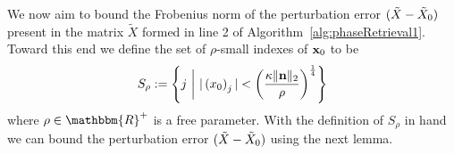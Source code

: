 We now aim to bound the Frobenius norm of the perturbation error $(\tilde{X} - \tilde{X}_0)$ present in the matrix $\tilde{X}$ formed in line 2 of Algorithm~\ref{alg:phaseRetrieval1}.
Toward this end we define the set of $\rho$-small indexes of $\mathbf x_0$ to be 
\begin{equation}
S_\rho := \left\{ j~\bigg|~ | \left( x_0 \right)_j | < \left(\frac{\kappa \| \mathbf n \|_2}{\rho} \right)^{\frac{1}{4}} \right\}
\label{equ:SrhoDef}
\end{equation}
where $\rho \in \mathbbm{R}^+$ is a free parameter.  
%
%
With the definition of $S_\rho$ in hand we can bound the perturbation error $(\tilde{X} - \tilde{X}_0)$ using the next lemma.
